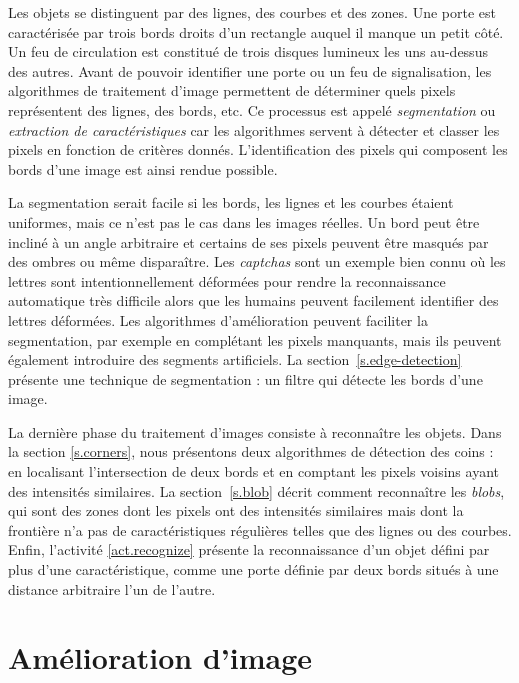 Les objets se distinguent par des lignes, des courbes et des zones. Une porte est caractérisée par trois bords droits d’un rectangle auquel il manque un petit côté. Un feu de circulation est constitué de trois disques lumineux les uns au-dessus des autres. Avant de pouvoir identifier une porte ou un feu de signalisation, les algorithmes de traitement d'image permettent de déterminer quels pixels représentent des lignes, des bords, etc. Ce processus est appelé \emph{segmentation} ou \emph{extraction de caractéristiques} car les algorithmes servent à détecter et classer les pixels en fonction de critères donnés. L'identification des pixels qui composent les bords d'une image est ainsi rendue possible.

La segmentation serait facile si les bords, les lignes et les courbes étaient uniformes, mais ce n'est pas le cas dans les images réelles. Un bord peut être incliné à un angle arbitraire et certains de ses pixels peuvent être masqués par des ombres ou même disparaître. Les \emph{captchas} sont un exemple bien connu où les lettres sont intentionnellement déformées pour rendre la reconnaissance automatique très difficile alors que les humains peuvent facilement identifier des lettres déformées. Les algorithmes d'amélioration peuvent faciliter la segmentation, par exemple en complétant les pixels manquants, mais ils peuvent également introduire des segments artificiels. La section~\ref{s.edge-detection} présente une technique de segmentation : un filtre qui détecte les bords d'une image.

La dernière phase du traitement d'images consiste à reconnaître les objets. Dans la section \ref{s.corners}, nous présentons deux algorithmes de détection des coins : en localisant l'intersection de deux bords et en comptant les pixels voisins ayant des intensités similaires. La section~\ref{s.blob} décrit comment reconnaître les \emph{blobs}, qui sont des zones dont les pixels ont des intensités similaires mais dont la frontière n’a pas de caractéristiques régulières telles que des lignes ou des courbes. Enfin, l'activité \ref{act.recognize} présente la reconnaissance d'un objet défini par plus d'une caractéristique, comme une porte définie par deux bords situés à une distance arbitraire l'un de l'autre.

\section{Amélioration d'image}\label{s.enhance}


